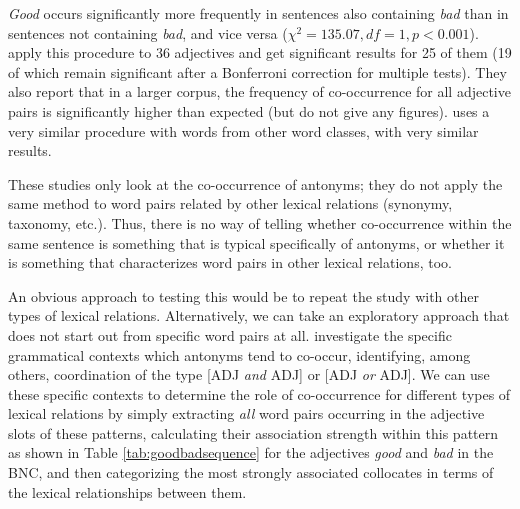 \textit{Good} occurs significantly more frequently in sentences also containing \textit{bad} than in sentences not containing \textit{bad}, and vice versa ($\chi^2 = 135.07, df = 1, \textit{p} < 0.001$). \citet{justeson_co-occurrences_1991} apply this procedure to 36 adjectives and get significant results for 25 of them (19 of which remain significant after a Bonferroni correction for multiple tests). They also report that in a larger corpus, the frequency of co-occurrence for all adjective pairs is significantly higher than expected (but do not give any figures). \citet{fellbaum_co-occurrence_1995} uses a very similar procedure with words from other word classes, with very similar results.

These studies only look at the co-occurrence of antonyms; they do not apply the same method to word pairs related by other lexical relations (synonymy, taxonomy, etc.). Thus, there is no way of telling whether co-occurrence within the same sentence is something that is typical specifically of antonyms, or whether it is something that characterizes word pairs in other lexical relations, too.

An obvious approach to testing this would be to repeat the study with other types of lexical relations. Alternatively, we can take an exploratory approach that does not start out from specific word pairs at all. \citet{justeson_co-occurrences_1991} investigate the specific grammatical contexts which antonyms tend to co-occur, identifying, among others, coordination of the type [ADJ \textit{and} ADJ] or [ADJ \textit{or} ADJ]. We can use these specific contexts to determine the role of co-occurrence for different types of lexical relations by simply extracting \textit{all} word pairs occurring in the adjective slots of these patterns, calculating their association strength within this pattern as shown in Table \ref{tab:goodbadsequence} for the adjectives \textit{good} and \textit{bad} in the BNC, and then categorizing the most strongly associated collocates in terms of the lexical relationships between them.

